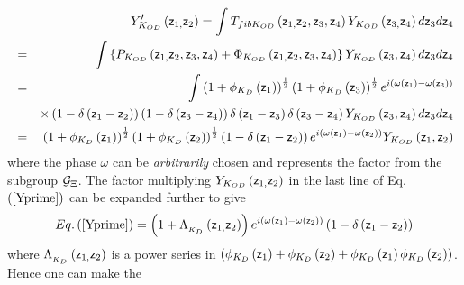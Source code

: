 \begin{eqnarray}
&&Y_{K_{OD}}^{\prime }\left( {\sf z}_{1,}{\sf z}_{2}\right) =\int
T_{fibK_{OD}}\left( {\sf z}_{1,}{\sf z}_{2},{\sf z}_{3},{\sf z}_{4}\right)
Y_{K_{OD}}\left( {\sf z}_{3,}{\sf z}_{4}\right) d{\sf z}_{3}d{\sf z}_{4} 
\nonumber \\
&=&\int \left\{ P_{K_{OD}}\left( {\sf z}_{1,}{\sf z}_{2},{\sf z}_{3},{\sf z}%
_{4}\right) +\Phi _{K_{OD}}\left( {\sf z}_{1,}{\sf z}_{2},{\sf z}_{3},{\sf z}%
_{4}\right) \right\} Y_{K_{OD}}\left( {\sf z}_{3},{\sf z}_{4}\right) d{\sf z}%
_{3}d{\sf z}_{4}  \nonumber \\
&=&\int \left( 1+\phi _{K_{D}}\left( {\sf z}_{1}\right) \right) ^{\frac{1}{2}%
}\left( 1+\phi _{K_{D}}\left( {\sf z}_{3}\right) \right) ^{\frac{1}{2}%
}e^{i\left( \omega \left( {\sf z}_{1}\right) -\omega \left( {\sf z}%
_{3}\right) \right) }  \nonumber \\
&&\times \left( 1-\delta \left( {\sf z}_{1}-{\sf z}_{2}\right) \right)
\left( 1-\delta \left( {\sf z}_{3}-{\sf z}_{4}\right) \right) \delta \left( 
{\sf z}_{1}-{\sf z}_{3}\right) \delta \left( {\sf z}_{3}-{\sf z}_{4}\right)
Y_{K_{OD}}\left( {\sf z}_{3},{\sf z}_{4}\right) d{\sf z}_{3}d{\sf z}_{4} 
\nonumber \\
&=&\left( 1+\phi _{K_{D}}\left( {\sf z}_{1}\right) \right) ^{\frac{1}{2}%
}\left( 1+\phi _{K_{D}}\left( {\sf z}_{2}\right) \right) ^{\frac{1}{2}%
}\left( 1-\delta \left( {\sf z}_{1}-{\sf z}_{2}\right) \right) e^{i\left(
\omega \left( {\sf z}_{1}\right) -\omega \left( {\sf z}_{2}\right) \right)
}Y_{K_{OD}}\left( {\sf z}_{1},{\sf z}_{2}\right)  \label{Yprime}
\end{eqnarray}%
where the phase $\omega $ can be {\it arbitrarily} chosen and represents the
factor from the subgroup ${\cal G}_{\Xi }$. The factor multiplying $%
Y_{K_{OD}}\left( {\sf z}_{1,}{\sf z}_{2}\right) $ in the last line of Eq.$%
\left( \ref{Yprime}\right) $ can be expanded further to give%
\begin{equation}
Eq.\left( \ref{Yprime}\right) =\left( 1+\Lambda _{_{K_{D}}}\left( {\sf z}%
_{1,}{\sf z}_{2}\right) \right) e^{i\left( \omega \left( {\sf z}_{1}\right)
-\omega \left( {\sf z}_{2}\right) \right) }\left( 1-\delta \left( {\sf z}%
_{1}-{\sf z}_{2}\right) \right)  \label{xpan}
\end{equation}%
where $\Lambda _{_{K_{D}}}\left( {\sf z}_{1,}{\sf z}_{2}\right) $ is a power
series in $\left( \phi _{K_{D}}\left( {\sf z}_{1}\right) +\phi
_{K_{D}}\left( {\sf z}_{2}\right) +\phi _{K_{D}}\left( {\sf z}_{1}\right)
\phi _{K_{D}}\left( {\sf z}_{2}\right) \right) $. Hence one can make the
